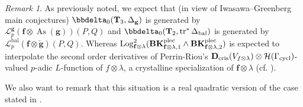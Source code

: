 \documentclass[10pt]{amsart}
\numberwithin{equation}{section}
\theoremstyle{definition}
\theoremstyle{remark} %
\newtheorem{rmk}[thm]{Remark}
\newcommand{\mbf}{\mathbf}
\newcommand{\scr}{\mathscr}
\newcommand{\mrm}{\mathrm}
\newcommand{\cal}{\mathcal}
\newcommand{\As}{\operatorname{As}}
\newcommand{\Log}{\operatorname{Log}}
\renewcommand{\b}{\mathrm{bal}}
\newcommand{\f}{\mathbf{f}}
\newcommand{\g}{\mathbf{g}}
\newcommand{\T}{\mathbf{T}}
\begin{document}
		\begin{rmk}
			As previously noted, we expect that (in view of Iwasawa–Greenberg main conjectures) $ \bbdelta_0(\T_{3}, \Delta_{\g}) $ is generated by $ 	\scr{L}_p^{\g}(\f \otimes \As(\g) )(P,Q)  $ and $ \bbdelta_0(\T_2, \operatorname{tr}^*\Delta_{\mathrm{bal}}) $ is generated by $ \scr{L}_p^{\b}(\f \otimes \breve{\g} )(P,Q) $. Whereas $  \Log^2_{\f \otimes \lambda}(\mathbf{BK}^{\rm plec}_{\f \otimes \lambda, 1} \wedge \mathbf{BK}^{\rm plec}_{\f \otimes \lambda, 2} )$ is expected to interpolate the second order derivatives of Perrin-Riou's $ \mbf D_{\rm cris}(V_{f \otimes \lambda}) \otimes \cal{H}(\Gamma_{\mrm{cycl}}) $-valued $ p $-adic $ L $-function of $ f \otimes \lambda $, a crystalline specialization of $ \f \otimes\lambda $ (cf. \cite{PR93,perrin-riou_padic}). 
			
			We also want to remark that this situation is a real quadratic version of the case stated in \cite[.3]{Darmon16GenralisedKatoClasses}.
		\end{rmk}
		
		
		
		
		
		
\end{document}
